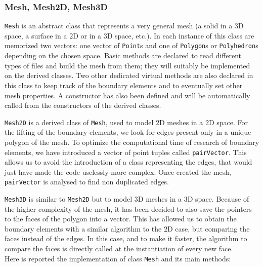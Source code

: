 \subsubsection{Mesh, Mesh2D, Mesh3D}
\verb|Mesh| is an abstract class that represents a very general mesh (a solid in a $3$D space, a surface in a $2$D or in a $3$D space, etc.). In each instance of this class are memorized two vectors: one vector of \verb|Point|s and one of \verb|Polygon|s or \verb|Polyhedron|s depending on the chosen space. Basic methods are declared to read different types of files and build the mesh from them; they will suitably be implemented on the derived classes. Two other dedicated virtual methods are also declared in this class to keep track of the boundary elements and to eventually set other mesh properties. A constructor has also been defined and will be automatically called from the constructors of the derived classes. 

\verb|Mesh2D| is a derived class of \verb|Mesh|, used to model $2$D meshes in a $2$D space. For the lifting of the boundary elements, we look for edges present only in a unique polygon of the mesh. To optimize the computational time of research of boundary elements, we have introduced a vector of point tuples called \verb|pairVector|. This allows us to avoid the introduction of a class representing the edges, that would just have made the code uselessly more complex. Once created the mesh, \verb|pairVector| is analysed to find non duplicated edges. 

\verb|Mesh3D| is similar to \verb|Mesh2D| but to model $3$D meshes in a $3$D space. Because of the higher complexity of the mesh, it has been decided to also save the pointers to the faces of the polygon into a vector. This has allowed us to obtain the boundary elements with a similar algorithm to the $2$D case, but comparing the faces instead of the edges. In this case, and to make it faster, the algorithm to compare the faces is directly called at the instantiation of every new face. \\

Here is reported the implementation of class \verb|Mesh| and its main methods:

